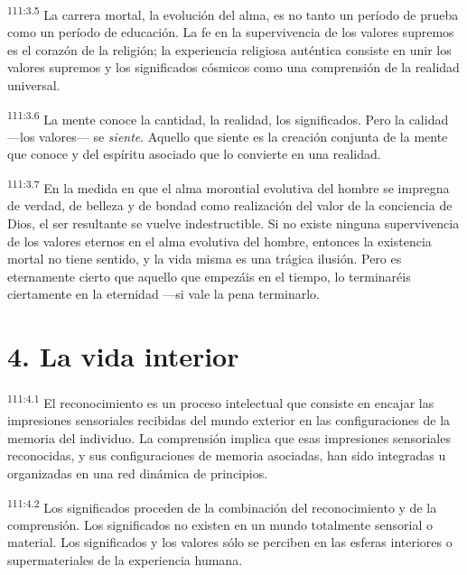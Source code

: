 \documentclass[twoside, 11pt]{book}
\begin{document}
\par
\textsuperscript{111:3.5} La carrera mortal, la evolución del alma, es no tanto un período de prueba como un período de educación. La fe en la supervivencia de los valores supremos es el corazón de la religión; la experiencia religiosa auténtica consiste en unir los valores supremos y los significados cósmicos como una comprensión de la realidad universal.

\par
\textsuperscript{111:3.6} La mente conoce la cantidad, la realidad, los significados. Pero la calidad ---los valores--- se \textit{siente}. Aquello que siente es la creación conjunta de la mente que conoce y del espíritu asociado que lo convierte en una realidad.

\par
\textsuperscript{111:3.7} En la medida en que el alma morontial evolutiva del hombre se impregna de verdad, de belleza y de bondad como realización del valor de la conciencia de Dios, el ser resultante se vuelve indestructible. Si no existe ninguna supervivencia de los valores eternos en el alma evolutiva del hombre, entonces la existencia mortal no tiene sentido, y la vida misma es una trágica ilusión. Pero es eternamente cierto que aquello que empezáis en el tiempo, lo terminaréis ciertamente en la eternidad ---si vale la pena terminarlo.

\section*{4. La vida interior}
\par
\textsuperscript{111:4.1} El reconocimiento es un proceso intelectual que consiste en encajar las impresiones sensoriales recibidas del mundo exterior en las configuraciones de la memoria del individuo. La comprensión implica que esas impresiones sensoriales reconocidas, y sus configuraciones de memoria asociadas, han sido integradas u organizadas en una red dinámica de principios.

\par
\textsuperscript{111:4.2} Los significados proceden de la combinación del reconocimiento y de la comprensión. Los significados no existen en un mundo totalmente sensorial o material. Los significados y los valores sólo se perciben en las esferas interiores o supermateriales de la experiencia humana.
\end{document}
